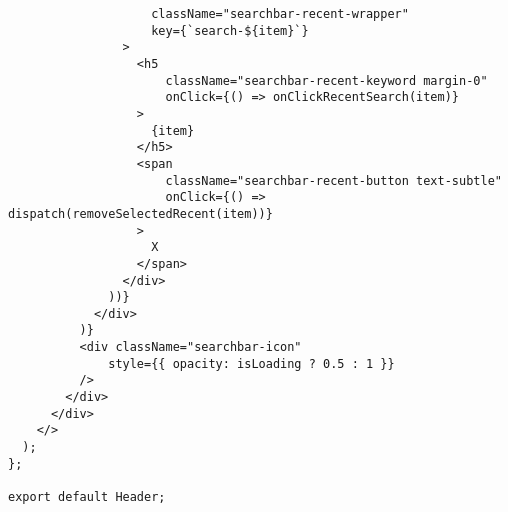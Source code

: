 \begin{lstlisting}
                    className="searchbar-recent-wrapper"
                    key={`search-${item}`}
                >
                  <h5
                      className="searchbar-recent-keyword margin-0"
                      onClick={() => onClickRecentSearch(item)}
                  >
                    {item}
                  </h5>
                  <span
                      className="searchbar-recent-button text-subtle"
                      onClick={() => dispatch(removeSelectedRecent(item))}
                  >
                    X
                  </span>
                </div>
              ))}
            </div>
          )}
          <div className="searchbar-icon"
              style={{ opacity: isLoading ? 0.5 : 1 }}
          />
        </div>
      </div>
    </>
  );
};

export default Header;
\end{lstlisting}
